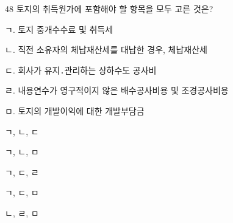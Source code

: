 \begin{question}{48}
토지의 취득원가에 포함해야 할 항목을 모두 고른 것은?
\begin{framedtext}
ㄱ. 토지 중개수수료 및 취득세 \par
ㄴ. 직전 소유자의 체납재산세를 대납한 경우, 체납재산세 \par
ㄷ. 회사가 유지․관리하는 상하수도 공사비 \par
ㄹ. 내용연수가 영구적이지 않은 배수공사비용 및 조경공사비용 \par
ㅁ. 토지의 개발이익에 대한 개발부담금 \par
\end{framedtext}
\begin{choices}
  \item ㄱ, ㄴ, ㄷ
  \item ㄱ, ㄴ, ㅁ
  \item ㄱ, ㄷ, ㄹ
  \item ㄱ, ㄷ, ㅁ
  \item ㄴ, ㄹ, ㅁ
\end{choices}
\end{question}
